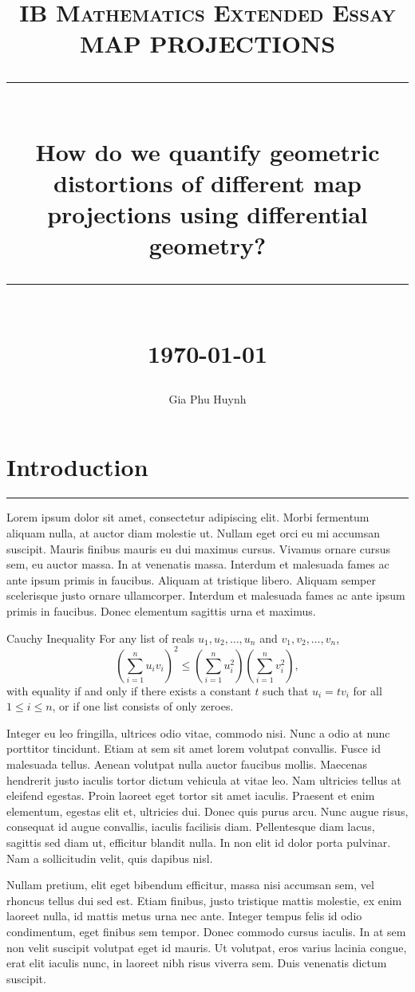\documentclass[12pt]{article}
\title{ 
    \normalsize \textsc{IB Mathematics Extended Essay} \\ [2.5cm]

	\LARGE MAP PROJECTIONS
	\rule{\linewidth}{0.5pt} \\
	\Large \textbf{How do we quantify geometric distortions of different map projections using differential geometry?}
	\rule{\linewidth}{1pt} \\ [1cm]
	\normalsize \today \vspace*{5\baselineskip}
}
\date{}
\author{Gia Phu Huynh}
\begin{document}
\maketitle

\pagebreak
\tableofcontents

\pagebreak
\raggedright
\section{Introduction}
\hrule height 1pt
\vspace*{5pt}
Lorem ipsum dolor sit amet, consectetur adipiscing elit. 
Morbi fermentum aliquam nulla, at auctor diam molestie ut. 
Nullam eget orci eu mi accumsan suscipit. 
Mauris finibus mauris eu dui maximus cursus. 
Vivamus ornare cursus sem, eu auctor massa. 
In at venenatis massa. Interdum et malesuada fames ac ante 
ipsum primis in faucibus. Aliquam at tristique libero. 
Aliquam semper scelerisque justo ornare ullamcorper. 
Interdum et malesuada fames ac ante ipsum primis in faucibus. 
Donec elementum sagittis urna et maximus.

\begin{definition}{Cauchy Inequality}
	For any list of reals $u_1, u_2, \ldots, u_n$ and $v_1, v_2, \ldots, v_n$,
	\[
	\left(\sum_{i=1}^{n}u_iv_i\right)^2 \le 
	\left(\sum_{i=1}^{n}u_i^2\right)
	\left(\sum_{i=1}^{n}v_i^2\right),
	\]
	with equality if and only if there exists a constant $t$ 
	such that $u_i = t v_i$ for all $1 \leq i \leq n$, or if one list consists of only zeroes. 
\end{definition}

Integer eu leo fringilla, ultrices odio vitae, commodo nisi. 
Nunc a odio at nunc porttitor tincidunt. Etiam at sem sit 
amet lorem volutpat convallis. Fusce id malesuada tellus. 
Aenean volutpat nulla auctor faucibus mollis. Maecenas 
hendrerit justo iaculis tortor dictum vehicula at vitae 
leo. Nam ultricies tellus at eleifend egestas. Proin laoreet 
eget tortor sit amet iaculis. Praesent et enim elementum, 
egestas elit et, ultricies dui. Donec quis purus arcu. Nunc 
augue risus, consequat id augue convallis, iaculis 
facilisis diam. Pellentesque diam lacus, sagittis sed 
diam ut, efficitur blandit nulla. In non elit id dolor 
porta pulvinar. Nam a sollicitudin velit, quis dapibus nisl.

Nullam pretium, elit eget bibendum efficitur, massa nisi accumsan 
sem, vel rhoncus tellus dui sed est. Etiam finibus, justo tristique 
mattis molestie, ex enim laoreet nulla, id mattis metus urna nec 
ante. Integer tempus felis id odio condimentum, eget finibus sem 
tempor. Donec commodo cursus iaculis. In at sem non velit suscipit 
volutpat eget id mauris. Ut volutpat, eros varius lacinia congue, 
erat elit iaculis nunc, in laoreet nibh risus viverra sem. Duis 
venenatis dictum suscipit.
\end{document}
